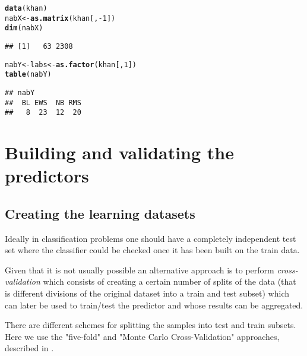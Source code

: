 \documentclass{article}\usepackage[]{graphicx}\usepackage[]{color}
\makeatletter
\newcommand{\hlnum}[1]{\textcolor[rgb]{0.686,0.059,0.569}{#1}}%
\newcommand{\hlopt}[1]{\textcolor[rgb]{0,0,0}{#1}}%
\newcommand{\hlstd}[1]{\textcolor[rgb]{0.345,0.345,0.345}{#1}}%
\newcommand{\hlkwb}[1]{\textcolor[rgb]{0.69,0.353,0.396}{#1}}%
\newcommand{\hlkwd}[1]{\textcolor[rgb]{0.737,0.353,0.396}{\textbf{#1}}}%
\newenvironment{kframe}{%
 \def\at@end@of@kframe{}%
 \ifinner\ifhmode%
  \def\at@end@of@kframe{\end{minipage}}%
  \begin{minipage}{\columnwidth}%
 \fi\fi%
 \def\FrameCommand##1{\hskip\@totalleftmargin \hskip-\fboxsep
 \colorbox{shadecolor}{##1}\hskip-\fboxsep
     \hskip-\linewidth \hskip-\@totalleftmargin \hskip\columnwidth}%
 \MakeFramed {\advance\hsize-\width
   \@totalleftmargin\z@ \linewidth\hsize
   \@setminipage}}%
 {\par\unskip\endMakeFramed%
 \at@end@of@kframe}
\newenvironment{knitrout}{}{} %
\makeatother
\begin{document}
\begin{knitrout}
\begin{kframe}
{\ttfamily\noindent\itshape{}}\begin{alltt}
\hlkwd{data}\hlstd{(khan)}
\hlstd{nabX} \hlkwb{<-} \hlkwd{as.matrix}\hlstd{(khan[,}\hlopt{-}\hlnum{1}\hlstd{])}
\hlkwd{dim}\hlstd{(nabX)}
\end{alltt}
\begin{verbatim}
## [1]   63 2308
\end{verbatim}
\begin{alltt}
\hlstd{nabY} \hlkwb{<-} \hlstd{labs}\hlkwb{<-}\hlkwd{as.factor}\hlstd{(khan[,}\hlnum{1}\hlstd{])}
\hlkwd{table}\hlstd{(nabY)}
\end{alltt}
\begin{verbatim}
## nabY
##  BL EWS  NB RMS 
##   8  23  12  20
\end{verbatim}
\end{kframe}
\end{knitrout}

\section{Building and validating the predictors}

\subsection{Creating the learning datasets}

Ideally in classification problems one should have a completely independent test set where the classifier could be checked once it has been built on the train data. 

Given that it is not usually possible an alternative approach is to perform \emph{cross-validation} which consists of creating a certain number of splits of the data (that is different divisions of the original dataset into a train and test subset) which can later be used to train/test the predictor and whose results can be aggregated.

There are different schemes for splitting the samples into test and train subsets. Here we use  the "five-fold" and "Monte Carlo Cross-Validation" approaches, described in \cite{CMAvignette}.
\end{document}
